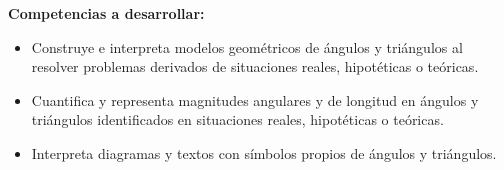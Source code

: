 \documentclass{sn-guia}
\begin{document}
%
\raggedright
\begin{tcbraster}[enhanced,raster columns=2,raster width=\linewidth,raster column skip=3pt,raster force size=false]
    \begin{caja}[title={\sffamily\scshape\bfseries Nombre},height=30pt,add to width=4cm]
    \end{caja}
    \begin{caja}[title={\sffamily\scshape\bfseries Curso},height=30pt,add to width=-4cm]
    \end{caja}    
    \begin{caja}[title={\sffamily\scshape\bfseries Fecha},height=30pt]
    \end{caja}                
    \begin{caja}[title={\sffamily\scshape\bfseries Profesor},height=30pt]
    \end{caja}
\end{tcbraster}


\begin{tcolorbox}[boxrule=1pt,colback=white,leftrule=3mm,grow to left by=-1cm,
    grow to right by=-1cm, enlarge top by=5mm, enlarge bottom by=5mm]
    {\bfseries\sffamily\large Competencias a desarrollar:}
    \begin{itemize}\raggedright
        \item Construye e interpreta modelos geométricos de ángulos y triángulos al resolver problemas derivados de situaciones reales, hipotéticas o teóricas.
        \item Cuantifica y representa magnitudes angulares y de longitud en ángulos y triángulos identificados en situaciones reales, hipotéticas o teóricas.
        \item Interpreta diagramas y textos con símbolos propios de ángulos y triángulos.
    \end{itemize}
\end{tcolorbox}
\end{document}
